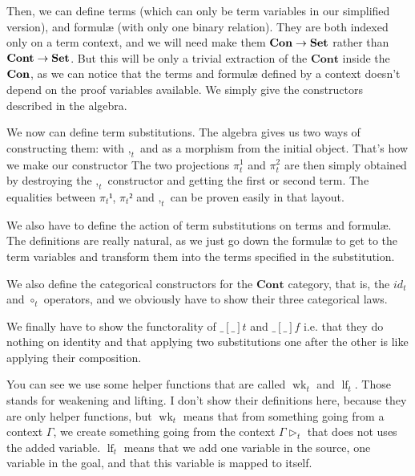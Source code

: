 \documentclass[10pt,a4paper]{article}
\begin{document}
			Then, we can define terms (which can only be term variables in our simplified version), and formulæ (with only one binary relation). They are both indexed only on a term context, and we will need make them $\textbf{Con} \rightarrow \textbf{Set}$ rather than $\textbf{Cont} \rightarrow \textbf{Set}$. But this will be only a trivial extraction of the $\textbf{Cont}$ inside the $\textbf{Con}$, as we can notice that the terms and formulæ defined by a context doesn't depend on the proof variables available. We simply give the constructors described in the algebra.
			
			\begin{tcolorbox}
				\vspace{-2ex}
				\agdasep
				\vspace{-7.5ex}
			\end{tcolorbox}
		
			We now can define term substitutions. The algebra gives us two ways of constructing them: with $,_t$ and as a morphism from the initial object. That's how we make our constructor The two projections $\pi_t^1$ and $\pi_t^2$ are then simply obtained by destroying the $,_t$ constructor and getting the first or second term. The equalities between $\pi_t¹$, $\pi_t²$ and $,_t$ can be proven easily in that layout.
			
			We also have to define the action of term substitutions on terms and formulæ. The definitions are really natural, as we just go down the formulæ to get to the term variables and transform them into the terms specified in the substitution.
			
			We also define the categorical constructors for the $\textbf{Cont}$ category, that is, the $id_t$ and $\circ_t$ operators, and we obviously have to show their three categorical laws.
		
			We finally have to show the functorality of $\_\left[\_\right]\!t$ and $\_\left[\_\right]\!f$ i.e. that they do nothing on identity and that applying two substitutions one after the other is like applying their composition.
			
			You can see we use some helper functions that are called $\operatorname{wk}_t$ and $\operatorname{lf}_t$. Those stands for weakening and lifting. I don't show their definitions here, because they are only helper functions, but $\operatorname{wk}_t$ means that from something going from a context $\Gamma$, we create something going from the context $\Gamma \triangleright_t$ that does not uses the added variable. $\operatorname{lf}_t$ means that we add one variable in the source, one variable in the goal, and that this variable is mapped to itself.
			
\end{document}
